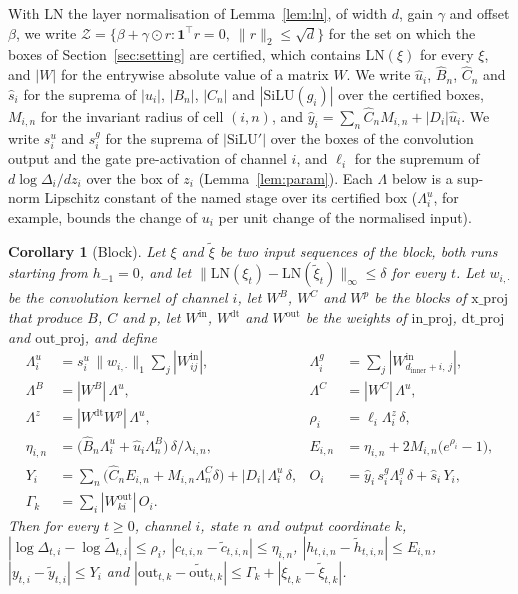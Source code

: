 \documentclass[11pt, a4paper]{article}
\newtheorem{corollary}[proposition]{Corollary}
\theoremstyle{remark}
\theoremstyle{plain}
\begin{document}
With $\mathrm{LN}$ the layer normalisation of Lemma~\ref{lem:ln}, of width $d$, gain $\gamma$ and
offset $\beta$, we write $\mathcal{Z} = \{ \beta + \gamma \odot r : \mathbf{1}^{\top} r = 0,\
\|r\|_2 \le \sqrt{d} \}$ for the set on which the boxes of Section~\ref{sec:setting} are
certified, which contains $\mathrm{LN}(\xi)$ for every $\xi$, and $|W|$ for the entrywise absolute
value of a matrix $W$. We write $\hat u_i$, $\hat B_n$, $\hat C_n$ and $\hat s_i$ for the suprema
of $|u_i|$, $|B_n|$, $|C_n|$ and $|\mathrm{SiLU}(g_i)|$ over the certified boxes, $M_{i,n}$ for
the invariant radius of cell $(i, n)$, and $\hat y_i = \sum_n \hat C_n M_{i,n} + |D_i|\hat u_i$.
We write $s^{u}_i$ and $s^{g}_i$ for the suprema of $|\mathrm{SiLU}'|$ over the boxes of the
convolution output and the gate pre-activation of channel $i$, and $\ell_i$ for the supremum of
$d\log\Delta_i/dz_i$ over the box of $z_i$ (Lemma~\ref{lem:param}). Each $\Lambda$ below is a
sup-norm Lipschitz constant of the named stage over its certified box ($\Lambda^{u}_i$, for
example, bounds the change of $u_i$ per unit change of the normalised input).

\begin{corollary}[Block]
\label{cor:block}
Let $\xi$ and $\tilde\xi$ be two input sequences of the block, both runs starting from
$h_{-1} = 0$, and let $\|\mathrm{LN}(\xi_t) - \mathrm{LN}(\tilde\xi_t)\|_\infty \le \delta$ for
every $t$. Let $w_{i,\cdot}$ be the convolution kernel of channel $i$, let $W^{B}$, $W^{C}$ and
$W^{p}$ be the blocks of $\mathrm{x\_proj}$ that produce $B$, $C$ and $p$, let
$W^{\mathrm{in}}$, $W^{\mathrm{dt}}$ and $W^{\mathrm{out}}$ be the weights of $\mathrm{in\_proj}$,
$\mathrm{dt\_proj}$ and $\mathrm{out\_proj}$, and define
\begin{align*}
  \Lambda^{u}_i &= s^{u}_i\, \|w_{i,\cdot}\|_1 \textstyle\sum_j |W^{\mathrm{in}}_{ij}|,
  &
  \Lambda^{g}_i &= \textstyle\sum_j |W^{\mathrm{in}}_{d_{\mathrm{inner}} + i,\, j}|,
  \\
  \Lambda^{B} &= |W^{B}|\, \Lambda^{u},
  &
  \Lambda^{C} &= |W^{C}|\, \Lambda^{u},
  \\
  \Lambda^{z} &= |W^{\mathrm{dt}} W^{p}|\, \Lambda^{u},
  &
  \rho_i &= \ell_i \Lambda^{z}_i\, \delta,
  \\
  \eta_{i,n} &= \bigl( \hat B_n \Lambda^{u}_i + \hat u_i \Lambda^{B}_n \bigr)\, \delta / \lambda_{i,n},
  &
  E_{i,n} &= \eta_{i,n} + 2M_{i,n}\bigl(e^{\rho_i} - 1\bigr),
  \\
  Y_i &= \textstyle\sum_n \bigl( \hat C_n E_{i,n} + M_{i,n} \Lambda^{C}_n \delta \bigr)
          + |D_i|\, \Lambda^{u}_i\, \delta,
  &
  O_i &= \hat y_i\, s^{g}_i \Lambda^{g}_i\, \delta + \hat s_i\, Y_i,
  \\
  \Gamma_k &= \textstyle\sum_i |W^{\mathrm{out}}_{k i}|\, O_i .
\end{align*}
Then for every $t \ge 0$, channel $i$, state $n$ and output coordinate $k$,
$|\log\Delta_{t,i} - \log\tilde\Delta_{t,i}| \le \rho_i$,
$|c_{t,i,n} - \tilde c_{t,i,n}| \le \eta_{i,n}$, $|h_{t,i,n} - \tilde h_{t,i,n}| \le E_{i,n}$,
$|y_{t,i} - \tilde y_{t,i}| \le Y_i$ and
$|\mathrm{out}_{t,k} - \widetilde{\mathrm{out}}_{t,k}| \le \Gamma_k + |\xi_{t,k} - \tilde\xi_{t,k}|$.
\end{corollary}
\end{document}
